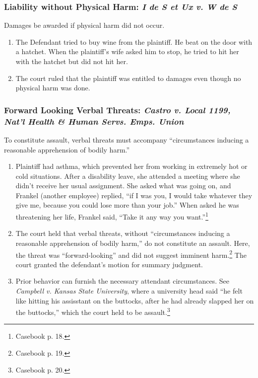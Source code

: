 \subsubsection{Liability without Physical Harm: \emph{I de S et Ux v. W de S}}

Damages be awarded if physical harm did not occur. 

\begin{enumerate}
    \item The Defendant tried to buy wine from the plaintiff. He beat on the 
    door with a hatchet. When the plaintiff's wife asked him to stop, he tried 
    to hit her with the hatchet but did not hit her.
    \item The court ruled that the plaintiff was entitled to damages even 
    though no physical harm was done.
\end{enumerate}
    
\subsubsection{Forward Looking Verbal Threats: \emph{Castro v. Local 1199, 
Nat'l Health \& Human Servs. Emps. Union}}

To constitute assault, verbal threats must accompany ``circumstances inducing 
a reasonable apprehension of bodily harm.''

\begin{enumerate}
    \item Plaintiff had asthma, which prevented her from working in extremely 
    hot or cold situations. After a disability leave, she attended a meeting 
    where she didn't receive her usual assignment. She asked what was going 
    on, and Frankel (another employee) replied, ``if I was you, I would take 
    whatever they give me, because you could lose more than your job.'' When 
    asked he was threatening her life, Frankel said, ``Take it any way you 
    want.''\footnote{Casebook p. 18.}
    \item The court held that verbal threats, without ``circumstances 
    inducing a reasonable apprehension of bodily harm,'' do not constitute an 
    assault. Here, the threat was ``forward-looking'' and did not suggest 
    imminent harm.\footnote{Casebook p. 19.} The court granted the defendant's 
    motion for summary judgment.
    \item Prior behavior can furnish the necessary attendant circumstances. 
    See \emph{Campbell v. Kansas State University}, where a university head 
    said ``he felt like hitting his assisstant on the buttocks, after he had 
    already slapped her on the buttocks,'' which the court held to be 
    assault.\footnote{Casebook p. 20.}
\end{enumerate}

